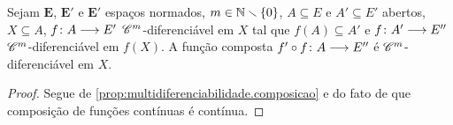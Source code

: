 \begin{proposition}
\label{prop:multidiferenciabilidade.continua.composicao}
Sejam $\bm E$, $\bm E'$ e $\bm E'$ espaços normados, $m \in \mathbb{N} \smallsetminus \{0\}$, $A \subseteq E$ e $A' \subseteq E'$ abertos, $X \subseteq A$, ${f}\colon {A} \longrightarrow {E'}$ $\mathscr{C}^m$-diferenciável em $X$ tal que $f(A) \subseteq A'$ e ${f}\colon {A'} \longrightarrow {E''}$ $\mathscr{C}^m$-diferenciável em $f(X)$. A função composta ${f' \circ f}\colon {A} \longrightarrow {E''}$ é $\mathscr{C}^m$-diferenciável em $X$.
\end{proposition}
\begin{proof}
Segue de \ref{prop:multidiferenciabilidade.composicao} e do fato de que composição de funções contínuas é contínua.
% 
% 
\end{proof}

